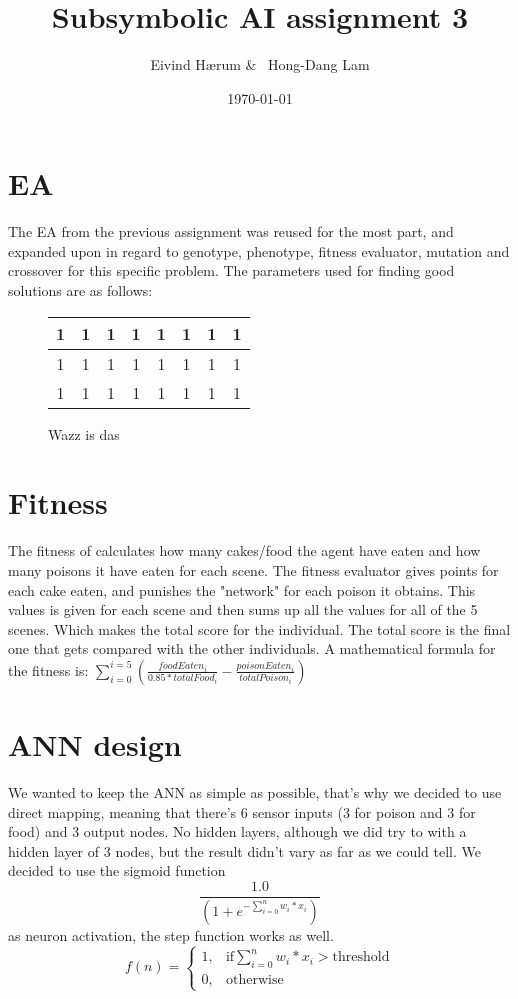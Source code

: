 \documentclass[12pt, a4paper]{article}
\title{Subsymbolic AI assignment 3}
\author{Eivind Hærum \& \ Hong-Dang Lam}
\date{\today} %
\begin{document}
\maketitle
% 
% 
\newpage

\tableofcontents
{}
\newpage

\section{EA}

The EA from the previous assignment was reused for the most part, and expanded upon in regard to genotype, phenotype, fitness evaluator, mutation and crossover for this specific problem. 
The parameters used for finding good solutions are as follows:

\begin{figure}[H]
	\begin{center}
	\begin{tabular}{c|c|c|c|c|c|c|c}
		1&1&1&1&1&1&1&1\\
		\hline
		1&1&1&1&1&1&1&1\\
		\hline
		1&1&1&1&1&1&1&1\\
	\end{tabular}
	\end{center}
	\caption*{Wazz is das}
\end{figure}


\section{Fitness}
The fitness of calculates how many cakes/food the agent have eaten and how many poisons it have eaten for each scene. The fitness evaluator gives points for each cake eaten, and punishes the "network" for each poison it obtains. This values is given for each scene and then sums up all the values for all of the 5 scenes. Which makes the total score for the individual. The total score is the final one that gets compared with the other individuals.
A mathematical formula for the fitness is:
$ \sum_{i=0}^{i =5}({\frac{foodEaten_i}{0.85 * totalFood_i} - \frac{poisonEaten_i}{totalPoison_i}}) $

\section{ANN design}
We wanted to keep the ANN as simple as possible, that's why we decided to use direct mapping, meaning that there's 6 sensor inputs (3 for poison and 3 for food) and 3 output nodes. No hidden layers, although we did try to with a hidden layer of 3 nodes, but the result didn't vary as far as we could tell.
We decided to use the sigmoid function $$ \frac{1.0}
{(1+e^ {-\sum_{i = 0}^{n}{w_i * x_i}})} $$as neuron activation, the step function works as well.  $$
f(n) =
\begin{cases}
1, & \text{if} \sum_{i = 0}^{n}{w_i * x_i}>\text{threshold} \\
0, & \text{otherwise }
\end{cases}
$$
\end{document}
